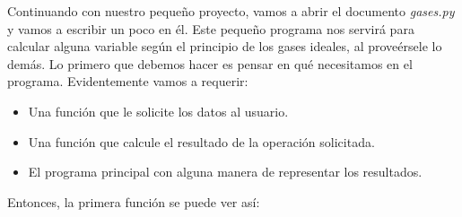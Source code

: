 \documentclass[10pt,letterpaper]{article}
\begin{document}
Continuando con nuestro peque\~no proyecto, vamos a abrir el documento \textit{gases.py} y vamos a escribir un poco en \'el. Este peque\~no programa nos servir\'a para calcular alguna variable seg\'un el principio de los gases ideales, al prove\'ersele lo dem\'as. Lo primero que debemos hacer es pensar en qu\'e necesitamos en el programa. Evidentemente vamos a requerir:

\begin{itemize}
\item Una funci\'on que le solicite los datos al usuario.
\item Una funci\'on que calcule el resultado de la operaci\'on solicitada.
\item El programa principal con alguna manera de representar los resultados.
\end{itemize}

Entonces, la primera funci\'on se puede ver as\'i:
\end{document}
